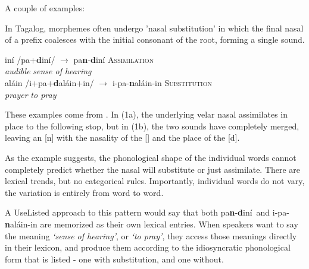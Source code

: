 \documentclass[12]{article}
\begin{document}
		A couple of examples: 
							
		In Tagalog, morphemes often undergo 'nasal substitution' in which the final nasal of a prefix coalesces with the initial consonant of the root, forming a single sound.
		
		
		\begin{exe}
			\ex
				\begin{xlist}
					\ex {}in\'i\textscriptg  \hspace{3ex} /pa{\bf {}}+{\bf d}in\'i\textscriptg/ \hspace{8ex} $\rightarrow$ pa{\bf n}-{\bf d}in\'i\textscriptg   \hspace{7ex} \textsc{Assimilation}\\
					{\it audible} {} {} {} {\it sense of hearing}\\
					\ex {}al\'ain \hspace{0.1ex} /i+pa{\bf \textipa{N}}+{\bf d}al\'ain+in/  $\rightarrow$ \textglotstop i-pa-{\bf n}al\'ain-in \hspace{0.5ex} \textsc{Substitution}\\
					{\it prayer} {} {} {} {\it to pray}\\
				\end{xlist}
			
		\end{exe}
	
		These examples come from \citet{zuraw10}.  In (1a), the underlying velar nasal assimilates in place to the following stop, but in (1b), the two sounds have completely merged, leaving an [n] with the nasality of the [] and the place of the [d].
		
		As the example suggests, the phonological shape of the individual words cannot completely predict whether the nasal will substitute or just assimilate.  There are lexical trends, but no categorical rules.  Importantly, individual words do not vary, the variation is entirely from word to word.
		
		A UseListed approach to this pattern would say that both pa{\bf n}-{\bf d}in\'i\textscriptg\ and \textglotstop i-pa-{\bf n}al\'ain-in are memorized as their own lexical entries.  When speakers want to say the meaning {\it `sense of hearing'}, or {\it `to pray'}, they access those meanings directly in their lexicon, and produce them according to the idiosyncratic phonological form that is listed - one with substitution, and one without.
		
\end{document}
